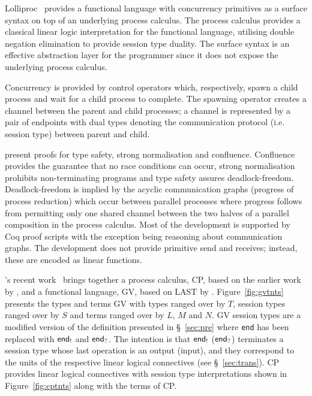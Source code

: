 Lolliproc~\cite{Mazurak:2010:LCC} provides a functional language with
concurrency primitives as a surface syntax on top of an underlying process
calculus. The process calculus provides a classical linear logic
interpretation for the functional language, utilising double negation
elimination to provide session type duality. The surface syntax is an
effective abstraction layer for the programmer since it does not expose the
underlying process calculus.

Concurrency is provided by control operators which, respectively, spawn a
child process and wait for a child process to complete. The spawning operator
creates a channel between the parent and child processes; a channel is
represented by a pair of endpoints with dual types denoting the communication
protocol (i.e. session type) between parent and child.

\citeauthor{Mazurak:2010:LCC} present proofs for type safety, strong
normalisation and confluence. Confluence provides the guarantee that no race
conditions can occur, strong normalisation prohibits non-terminating programs
and type safety assures deadlock-freedom. Deadlock-freedom is implied by the
acyclic communication graphs (progress of process reduction) which occur
between parallel processes where progress follows from permitting only one
shared channel between the two halves of a parallel composition in the process
calculus. Most of the development is supported by Coq proof scripts with the
exception being reasoning about communication graphs. The development does not
provide primitive send and receives; instead, these are encoded as linear
functions.





\citeauthor{Wadler:2014}'s recent work~\cite{Wadler:2014} brings together a
process calculus, CP, based on the earlier work by
\citeauthor{Caires:2010:STI}, and a functional language, GV, based on LAST by
\citeauthor{Gay:2010:LAST}. Figure~\ref{fig:gvtnts} presents the types and
terms GV with types ranged over by $T$, session types ranged over by $S$ and
terms ranged over by $L$, $M$ and $N$. GV session types are a modified version
of the definition presented in \S~\ref{sec:pre} where \lstinline{end} has been
replaced with $\textsf{end}_{!}$ and $\textsf{end}_{?}$. The intention is that $\textsf{end}_{!}$
($\textsf{end}_{?}$) terminates a session type whose last operation is an output
(input), and they correspond to the units of the respective linear logical
connectives (see \S~\ref{sec:trans}). CP provides linear logical connectives
with session type interpretations shown in Figure~\ref{fig:cptnts} along with
the terms of CP.

